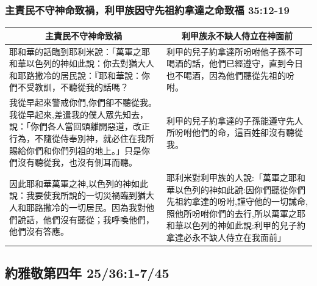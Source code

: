 \subsubsection{主責民不守神命致禍，利甲族因守先祖約拿達之命致福 35:12-19}
\begin{table}[H]
\centering
\begin{tabular}{p{9cm}|p{8.5cm}}\hline\hline
\multicolumn{1}{c|}{主責民不守神命致禍}&\multicolumn{1}{c}{利甲族永不缺人侍立在神面前}\\\hline
耶和華的話臨到耶利米說：「萬軍之耶和華以色列的神如此說：你去對猶大人和耶路撒冷的居民說：『耶和華說：你們不受教訓，不聽從我的話嗎？&利甲的兒子約拿達所吩咐他子孫不可喝酒的話，他們已經遵守，直到今日也不喝酒，因為他們聽從先祖的吩咐。\\\hline
我從早起來警戒你們,你們卻不聽從我。我從早起來,差遣我的僕人眾先知去，說：「你們各人當回頭離開惡道，改正行為，不隨從侍奉別神，就必住在我所賜給你們和你們列祖的地上。」只是你們沒有聽從我，也沒有側耳而聽。&利甲的兒子約拿達的子孫能遵守先人所吩咐他們的命，這百姓卻沒有聽從我。\\\hline
因此耶和華萬軍之神,以色列的神如此說：我要使我所說的一切災禍臨到猶大人和耶路撒冷的一切居民。因為我對他們說話，他們沒有聽從；我呼喚他們，他們沒有答應。
&耶利米對利甲族的人說:「萬軍之耶和華以色列的神如此說:因你們聽從你們先祖約拿達的吩咐,謹守他的一切誡命,照他所吩咐你們的去行,所以萬軍之耶和華以色列的神如此說:利甲的兒子約拿達必永不缺人侍立在我面前」\\\hline
\end{tabular}
\end{table}



\subsection{約雅敬第四年 25/36:1-7/45}
